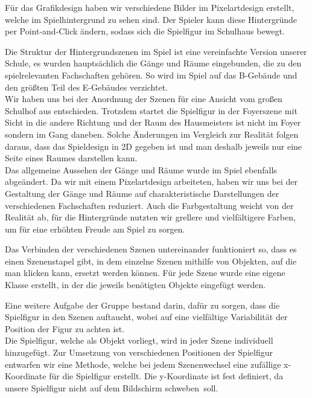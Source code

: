 Für das Grafikdesign haben wir verschiedene Bilder im Pixelartdesign erstellt, welche im Spielhintergrund zu sehen sind.
Der Spieler kann diese Hintergründe per Point-and-Click ändern, sodass sich die Spielfigur im Schulhaus bewegt. \par
Die Struktur der Hintergrundszenen im Spiel ist eine vereinfachte Version unserer Schule, es wurden hauptsächlich die Gänge und Räume eingebunden, die zu den 
spielrelevanten Fachschaften gehören. So wird im Spiel auf das B-Gebäude und den größten Teil des E-Gebäudes verzichtet. \\
Wir haben uns bei der Anordnung der Szenen für eine Ansicht vom großen Schulhof aus entschieden. Trotzdem startet die Spielfigur in der Foyerszene mit 
Sicht in die andere Richtung und der Raum des Hausmeisters ist nicht im Foyer sondern im Gang daneben. Solche Änderungen im Vergleich zur Realität folgen daraus,
dass das Spieldesign in 2D gegeben ist und man deshalb jeweils nur eine Seite eines Raumes darstellen kann. \\
Das allgemeine Aussehen der Gänge und Räume wurde im Spiel ebenfalls abgeändert. Da wir mit einem Pixelartdesign arbeiteten, haben wir uns bei der Gestaltung der 
Gänge und Räume auf charakteristische Darstellungen der verschiedenen Fachschaften reduziert. Auch die Farbgestaltung weicht von der Realität ab, für die 
Hintergründe nutzten wir grellere und vielfältigere Farben, um für eine erhöhten Freude am Spiel zu sorgen. \par
Das Verbinden der verschiedenen Szenen untereinander funktioniert so, dass es einen Szenenstapel gibt, in dem einzelne Szenen mithilfe von Objekten, auf die man 
klicken kann, ersetzt werden können. 
Für jede Szene wurde eine eigene Klasse erstellt, in der die jeweils benötigten Objekte eingefügt werden. \par
Eine weitere Aufgabe der Gruppe bestand darin, dafür zu sorgen, dass die Spielfigur in den Szenen auftaucht, wobei auf eine vielfältige Variabilität der Position
der Figur zu achten ist. \\ 
Die Spielfigur, welche als Objekt vorliegt, wird in jeder Szene individuell hinzugefügt.
Zur Umsetzung von verschiedenen Positionen der Spielfigur entwarfen wir eine Methode, welche bei jedem Szenenwechsel eine zufällige x-Koordinate für die 
Spielfigur erstellt. Die y-Koordinate ist fest definiert, da unsere Spielfigur nicht auf dem Bildschirm \glqq schweben\grqq\ soll.
